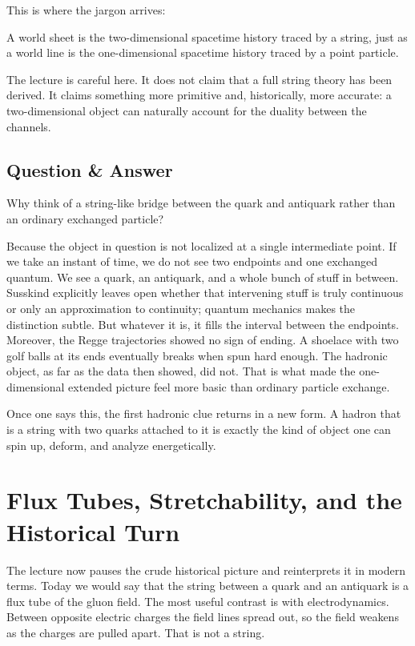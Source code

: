 This is where the jargon arrives:
\begin{definition}
A world sheet is the two-dimensional spacetime history traced by a string, just as a world line is the one-dimensional spacetime history traced by a point particle.
\end{definition}
The lecture is careful here. It does not claim that a full string theory has been derived. It claims something more primitive and, historically, more accurate: a two-dimensional object can naturally account for the duality between the channels.

\subsection{Question \& Answer}

Why think of a string-like bridge between the quark and antiquark rather than an ordinary exchanged particle?

Because the object in question is not localized at a single intermediate point. If we take an instant of time, we do not see two endpoints and one exchanged quantum. We see a quark, an antiquark, and a whole bunch of stuff in between. Susskind explicitly leaves open whether that intervening stuff is truly continuous or only an approximation to continuity; quantum mechanics makes the distinction subtle. But whatever it is, it fills the interval between the endpoints. Moreover, the Regge trajectories showed no sign of ending. A shoelace with two golf balls at its ends eventually breaks when spun hard enough. The hadronic object, as far as the data then showed, did not. That is what made the one-dimensional extended picture feel more basic than ordinary particle exchange.

Once one says this, the first hadronic clue returns in a new form. A hadron that is a string with two quarks attached to it is exactly the kind of object one can spin up, deform, and analyze energetically.

\section{Flux Tubes, Stretchability, and the Historical Turn}

The lecture now pauses the crude historical picture and reinterprets it in modern terms. Today we would say that the string between a quark and an antiquark is a flux tube of the gluon field. The most useful contrast is with electrodynamics. Between opposite electric charges the field lines spread out, so the field weakens as the charges are pulled apart. That is not a string.

